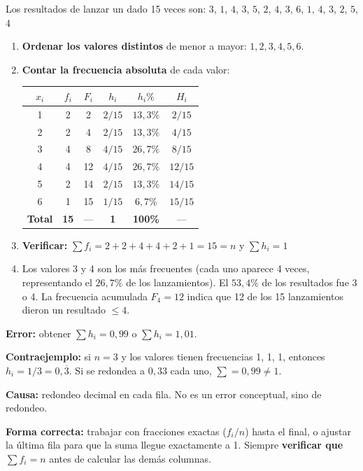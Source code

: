 \documentclass[11pt, letterpaper]{article}
\begin{document}
\begin{tcolorbox}[examplebox, title={Ej. 3. Construir una tabla de frecuencias para datos no agrupados}]
Los resultados de lanzar un dado 15 veces son:
$3$, $1$, $4$, $3$, $5$, $2$, $4$, $3$, $6$, $1$, $4$, $3$, $2$, $5$, $4$

\begin{enumerate}[label=\textbf{\arabic*.}, leftmargin=2.8cm]
  \item[\textbf{Paso 1.}] \textbf{Ordenar los valores distintos} de menor a mayor: $1, 2, 3, 4, 5, 6$.
  \medskip
  \item[\textbf{Paso 2.}] \textbf{Contar la frecuencia absoluta} de cada valor:
  \begin{center}
  \renewcommand{\arraystretch}{1.3}
  \begin{tabular}{c c c c c c}
  \toprule
  $x_i$ & $f_i$ & $F_i$ & $h_i$ & $h_i\%$ & $H_i$\\
  \midrule
  1 & 2 & 2  & $2/15$ & $13{,}3\%$ & $2/15$\\
  2 & 2 & 4  & $2/15$ & $13{,}3\%$ & $4/15$\\
  3 & 4 & 8  & $4/15$ & $26{,}7\%$ & $8/15$\\
  4 & 4 & 12 & $4/15$ & $26{,}7\%$ & $12/15$\\
  5 & 2 & 14 & $2/15$ & $13{,}3\%$ & $14/15$\\
  6 & 1 & 15 & $1/15$ & $6{,}7\%$  & $15/15$\\
  \midrule
  \textbf{Total} & \textbf{15} & --- & \textbf{1} & \textbf{100\%} & ---\\
  \bottomrule
  \end{tabular}
  \end{center}
  \medskip
  \item[\textbf{Paso 3.}] \textbf{Verificar:} $\sum f_i = 2+2+4+4+2+1 = 15 = n$ \checkmark \quad y \quad $\sum h_i = 1$ \checkmark
  \medskip
  \item[\textbf{Conclusión.}] Los valores 3 y 4 son los más frecuentes (cada uno aparece 4 veces, representando el $26{,}7\%$ de los lanzamientos). El $53{,}4\%$ de los resultados fue 3 o 4. La frecuencia acumulada $F_4 = 12$ indica que 12 de los 15 lanzamientos dieron un resultado $\leq 4$.
\end{enumerate}
\end{tcolorbox}

\begin{tcolorbox}[warningbox, title={Error frecuente: frecuencias relativas que no suman exactamente 1}]
\textbf{Error:} obtener $\sum h_i = 0{,}99$ o $\sum h_i = 1{,}01$.

\medskip
\textbf{Contraejemplo:} si $n=3$ y los valores tienen frecuencias 1, 1, 1, entonces $h_i = 1/3 = 0{,}\overline{3}$. Si se redondea a $0{,}33$ cada uno, $\sum = 0{,}99 \neq 1$.

\medskip
\textbf{Causa:} redondeo decimal en cada fila. No es un error conceptual, sino de redondeo.

\medskip
\textbf{Forma correcta:} trabajar con fracciones exactas ($f_i/n$) hasta el final, o ajustar la última fila para que la suma llegue exactamente a 1. Siempre \textbf{verificar que $\sum f_i = n$} antes de calcular las demás columnas.
\end{tcolorbox}
\end{document}
